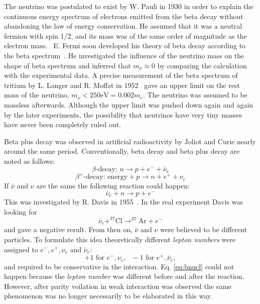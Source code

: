 The neutrino was postulated to exist by W. Pauli in 1930 in order to
explain the continuous energy spectrum of electrons emitted from the
beta decay without abandoning the law of energy conservation. He
assumed that it was a neutral fermion with spin 1/2, and its mass was
of the same order of magnitude as the electron mass.~\cite{Pau30} E.
Fermi soon developed his theory of beta decay according to the beta
spectrum~\cite{Fer33,Fer34}. He investigated the influence of the
neutrino mass on the shape of beta spectrum and inferred that $m_\nu
\approx 0$ by comparing the calculation with the experimental data. A
precise measurement of the beta spectrum of tritium by L. Langer and
R. Moffat in 1952~\cite{Lan52} gave an upper limit on the rest mass of
the neutrino, $m_\nu < 250 \mbox{eV} = 0.002m_e$. The neutrino was
assumed to be massless afterwards. Although the upper limit was pushed
down again and again by the later experiments, the possibility that
neutrinos have very tiny masses have never been completely ruled out.

Beta plus decay was observed in artificial radioactivity by Joliot and
Curie nearly around the same period. Conventionally, beta decay and
beta plus decay are noted as follows:
\begin{equation}
  \label{eq:bd}
  \beta\mbox{-decay: } n \rightarrow p+e^{-}+\bar{\nu}_e
\end{equation}
\begin{equation}
  \label{eq:bpd}
  \beta^+\mbox{-decay: energy} + p \rightarrow n+e^{+}+\nu_e
\end{equation}
If $\bar{\nu}$ and $\nu$ are the same the following reaction could
happen:
\begin{equation}
  \label{eq:bnun}
  \bar{\nu}_e + n \rightarrow p+e^{-}
\end{equation}
This was investigated by R. Davis in 1955~\cite{Dav55,Dav56}. In the
real experiment Davis was looking for
\begin{equation}
  \label{eq:bnucl}
  \bar{\nu}_e + ^{37}\mbox{Cl} \rightarrow ^{37}\mbox{Ar}+e^{-}
\end{equation}
and gave a negative result. From then on, $\bar{\nu}$ and $\nu$ were
believed to be different particles. To formulate this idea
theoretically different \emph{lepton numbers} were assigned to $e^{-},
e^{+}, \nu_e$ and $\bar{\nu}_e$:
\begin{equation}
  \label{eq:ln}
  +1 \mbox{ for }e^{-}, \nu_e, \mbox{   }-1 \mbox{ for }e^{+},\bar{\nu}_e,
\end{equation}
and required to be conservative in the interaction. Eq. \ref{eq:bnucl}
could not happen because the \emph{lepton number} was different before
and after the reaction. However, after parity voilation in weak
interaction was observed the same phenomenon was no longer necessarily
to be elaborated in this way.

